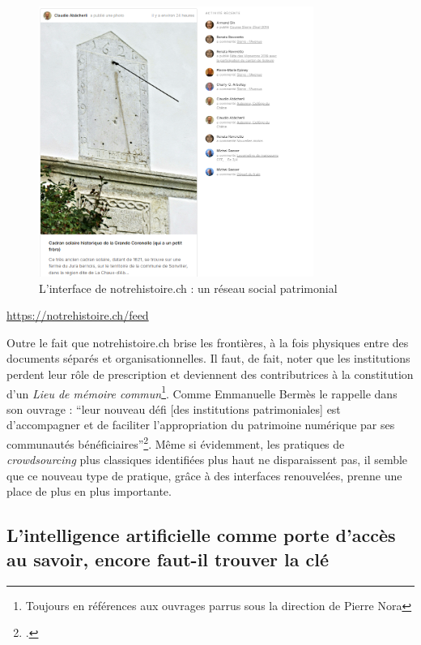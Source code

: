 \begin{figure}[h!]
	\centering
	\includegraphics[width=0.8\textwidth]{images/image22.png}
	\caption{L'interface de notrehistoire.ch : un réseau social patrimonial}
	\label{fig:image21}
\end{figure}

\begin{center}
	\url{https://notrehistoire.ch/feed}
\end{center}

Outre le fait que notrehistoire.ch brise les frontières, à la fois physiques entre des documents séparés et organisationnelles. Il faut, de fait, noter que les institutions perdent leur rôle de prescription et deviennent des contributrices à la constitution d’un \textit{Lieu de mémoire commun}\footnote{Toujours en références aux ouvrages parrus sous la direction de Pierre Nora}. Comme Emmanuelle Bermès le rappelle dans son ouvrage : \enquote{leur nouveau défi [des institutions patrimoniales] est d’accompagner et de faciliter l’appropriation du patrimoine numérique par ses communautés bénéficiaires}\footcite[p. 186]{bermes2024}. Même si évidemment, les pratiques de \textit{crowdsourcing} plus classiques identifiées plus haut ne disparaissent pas, il semble que ce nouveau type de pratique, grâce à des interfaces renouvelées, prenne une place de plus en plus importante.


\subsection{L'intelligence artificielle comme porte d'accès au savoir, encore faut-il trouver la clé}

